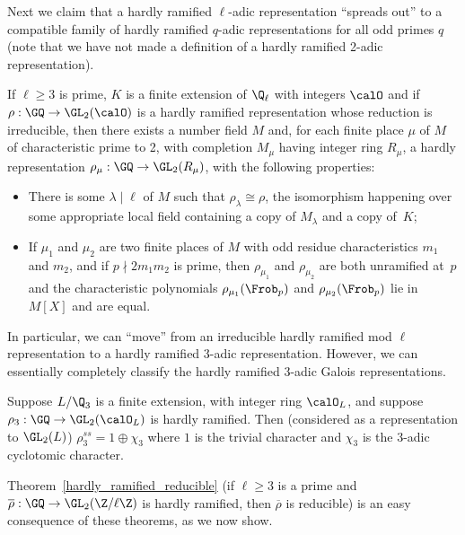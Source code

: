 Next we claim that a hardly ramified $\ell$-adic representation ``spreads out'' to a compatible
family of hardly ramified $q$-adic representations for all odd primes $q$ (note that we have
not made a definition of a hardly ramified 2-adic representation).

\begin{theorem}
  \label{hardly-ramified-spreads-out}
  If $\ell\geq3$ is prime, $K$ is a finite extension of $\Q_\ell$
  with integers $\calO$ and if $\rho:\GQ\to\GL_2(\calO)$ is a hardly ramified representation
  whose reduction is irreducible,
  then there exists a number field $M$ and, for each finite place $\mu$ of $M$
  of characteristic prime to 2, with completion $M_\mu$ having integer ring $R_\mu$,
  a hardly representation $\rho_\mu:\GQ\to\GL_2(R_\mu)$, with the following properties:
  \begin{itemize}
    \item There is some $\lambda\mid\ell$ of $M$ such that $\rho_\lambda\cong\rho$,
      the isomorphism happening over some appropriate local field containing a copy
      of $M_\lambda$ and a copy of~$K$;
    \item If $\mu_1$ and $\mu_2$ are two finite places of $M$ with odd residue characteristics $m_1$
      and $m_2$, and if $p\nmid 2m_1m_2$ is prime, then $\rho_{\mu_1}$ and $\rho_{\mu_2}$
      are both unramified at~$p$ and the characteristic polynomials $\rho_{\mu_1}(\Frob_p)$
      and $\rho_{\mu_2}(\Frob_p)$ lie in $M[X]$ and are equal.
  \end{itemize}
\end{theorem}

In particular, we can ``move'' from an irreducible hardly ramified mod $\ell$ representation
to a hardly ramified 3-adic representation.
However, we can essentially completely classify the hardly ramified 3-adic Galois representations.

\begin{theorem}
  \label{hardly-ramified-3adic-reducible}
  Suppose $L/\Q_3$ is a finite extension, with integer ring $\calO_L$, and suppose
  $\rho_3:\GQ\to\GL_2(\calO_L)$ is hardly ramified. Then (considered as a representation
  to $\GL_2(L)$) $\rho_3^{ss}=1\oplus\chi_3$
  where $1$ is the trivial character and $\chi_3$ is the 3-adic cyclotomic character.
\end{theorem}

Theorem~\ref{hardly_ramified_reducible} (if $\ell\geq 3$ is a prime and
$\overline{\rho}:\GQ\to\GL_2(\Z/\ell\Z)$ is hardly ramified,
then $\overline{\rho}$ is reducible) is an easy consequence of these theorems,
as we now show.

